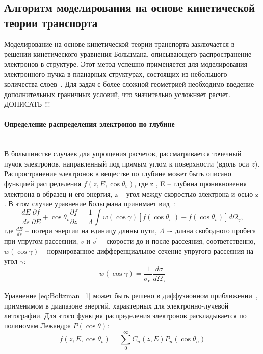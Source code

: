 \subsection{Алгоритм моделирования на основе кинетической теории транспорта}
Моделирование на основе кинетической теории транспорта заключается в решении кинетического уравнения Больцмана, описывающего распространение электронов в структуре. Этот метод успешно применяется для моделирования электронного пучка в планарных структурах, состоящих из небольшого количества слоев~\cite{Stepanova_2006, Stepanova_2010}. Для задач с более сложной геометрией необходимо введение дополнительных граничных условий, что значительно усложняет расчет. ДОПИСАТЬ !!!


\paragraph{Определение распределения электронов по глубине} \mbox{} \\
\indent В большинстве случаев для упрощения расчетов, рассматривается точечный пучок электронов, направленный под прямым углом к поверхности (вдоль оси $z$). Распространение электронов в веществе по глубине может быть описано функцией распределения $f(z, E, \cos \theta_v)$, где z , E – глубина проникновения электрона в образец и его энергия, z – угол между скоростью электрона и осью z . В этом случае уравнение Больцмана принимает вид~\cite{ME_rev_60}:
\begin{equation} \label{eq:Boltzman_1}
	\frac{d E}{d s} \frac{\partial f}{\partial E}+\cos \theta_v \frac{\partial f}{\partial z}=\frac{1}{\Lambda} \int w(\cos \gamma)\left[f\left(\cos \theta_{v^{\prime}}\right)-f\left(\cos \theta_v\right)\right] d \Omega_\gamma,
\end{equation}
где $\frac{dE}{ds}$ -- потери энергии на единицу длины пути, $\Lambda$ –- длина свободного пробега при упругом рассеянии, $v$ и $v^{\prime}$ -- скорости до и после рассеяния, соответственно, $w(\cos \gamma)$ -- нормированное дифференциальное сечение упругого рассеяния на угол $\gamma$:
\begin{equation} \label{eq:Boltzman_2}
	w(\cos \gamma)=\frac{1}{\sigma_{\mathrm{el}}} \frac{d \sigma}{d \Omega_\gamma}
\end{equation}

Уравнение \ref{eq:Boltzman_1} может быть решено в диффузионном приближении~\cite{ME_rev_61}, применимом в диапазоне энергий, характерных для электронно-лучевой литографии. Для этого функция распределения электронов раскладывается по полиномам Лежандра $P(\cos \theta)$:
\begin{equation} \label{eq:Boltzman_3}
	f\left(z, E, \cos \theta_v\right)=\sum_0^{\infty} C_n(z, E) P_n\left(\cos \theta_n\right)
\end{equation}

